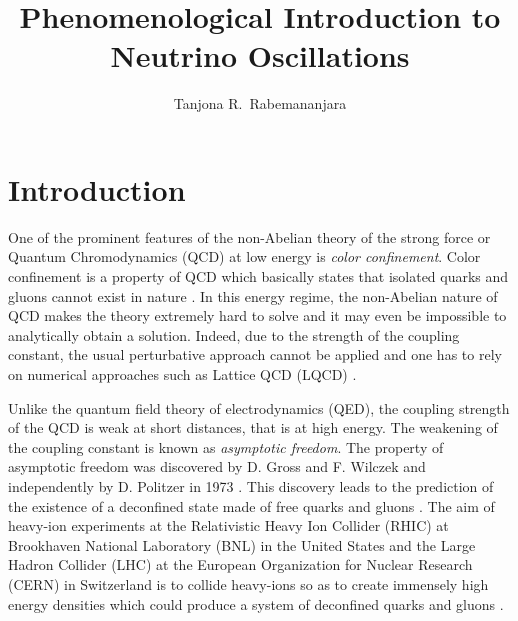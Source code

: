 \documentclass[twocolumn,secnumarabic,amssymb, nobibnotes, aps, prd,10pt]{revtex4-1}
\begin{document}
\title{\texorpdfstring{Phenomenological Introduction to Neutrino Oscillations}{Phenomenological Introduction to Neutrino Oscillations}}

\author{Tanjona R.\ Rabemananjara}

\maketitle

\section{Introduction}

One of the prominent features of the non-Abelian theory of the strong force or Quantum Chromodynamics (QCD) at low energy is \emph{color confinement}. Color confinement is a property of QCD which basically states that isolated quarks and gluons cannot exist in nature \cite{Marciano:1977su}. In this energy regime, the non-Abelian nature of QCD makes the theory extremely hard to solve and it may even be impossible to analytically obtain a solution. Indeed, due to the strength of the coupling constant, the usual perturbative approach cannot be applied and one has to rely on numerical approaches such as Lattice QCD (LQCD) \cite{Beringer:1900zz}.

Unlike the quantum field theory of electrodynamics (QED), the coupling strength of the QCD is weak at short distances, that is at high energy. The weakening of the coupling constant is known as \emph{asymptotic freedom}. The property of asymptotic freedom was discovered by D. Gross and F. Wilczek \cite{Gross:1973id} and independently by D. Politzer in 1973 \cite{Politzer:1973fx}. This discovery leads to the prediction of the existence of a deconfined state made of free quarks and gluons \cite{Cabibbo:1975ig,Collins:1974ky}. The aim of heavy-ion experiments at the Relativistic Heavy Ion Collider (RHIC) at Brookhaven National Laboratory (BNL) in the United States and the Large Hadron Collider (LHC) at the European Organization for Nuclear Research (CERN) in Switzerland is to collide heavy-ions so as to create immensely high energy densities which could produce a system of deconfined quarks and gluons \cite{Schmidt:1992ge,Harris:1996zx}. 
\end{document}
